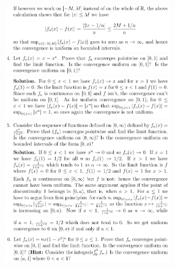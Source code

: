 \documentclass[8pt,landscape]{article}
\begin{document}
\begin{multicols}{3}
    \includegraphics[width=270]{008.png} \\
    \includegraphics[width=270]{009.png} \\
    \includegraphics[width=270]{010.png} \\
    \includegraphics[width=270]{011.png} \\
    \includegraphics[width=270]{012.png} \\
    \includegraphics[width=270]{013.png} \\

\end{multicols}
\end{document}

